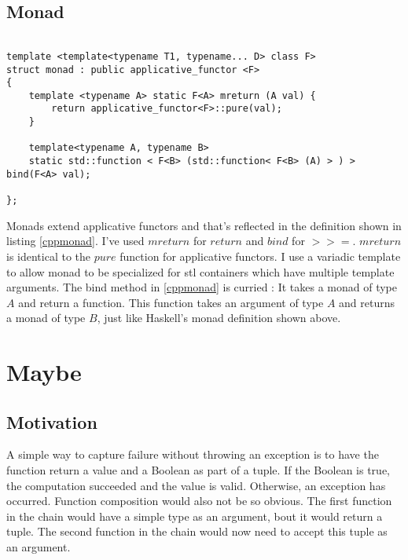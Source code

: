 \documentclass[12pt,fleqn]{article}
\begin{document}
%
%
%
\subsection{Monad}
%
%
%
\begin{minipage}{\linewidth}
\begin{lstlisting}[caption=monad defintion in C++, label=cppmonad]

template <template<typename T1, typename... D> class F> 
struct monad : public applicative_functor <F>
{
	template <typename A> static F<A> mreturn (A val) {
		return applicative_functor<F>::pure(val);
	}

	template<typename A, typename B>
	static std::function < F<B> (std::function< F<B> (A) > ) > bind(F<A> val);
	
};

\end{lstlisting}
\end{minipage}
%
%
%

Monads extend applicative functors and that's reflected in the definition shown in listing \ref{cppmonad}.
I've used $mreturn$ for $return$ and $bind$ for $>>=$.
$mreturn$ is identical to the $pure$ function for applicative functors.
I use a variadic template to allow monad to be specialized for stl containers which have multiple template arguments. 
The bind method in \ref{cppmonad} is curried : It takes a monad of type $A$ and return a function.
This function takes an argument of type $A$ and returns a monad of type $B$, just like Haskell's monad definition shown above.

%
%
\section{Maybe}
%

%
\subsection{Motivation}
%
%

A simple way to capture failure without throwing an exception is to have the function return a value and a Boolean as part of a tuple.
If the Boolean is true, the computation succeeded and the value is valid. Otherwise, an exception has occurred.
Function composition would also not be so obvious. The first function in the chain would have a simple type as an argument, bout it would return a tuple.
The second function in the chain would now need to accept this tuple as an argument.
\end{document}
